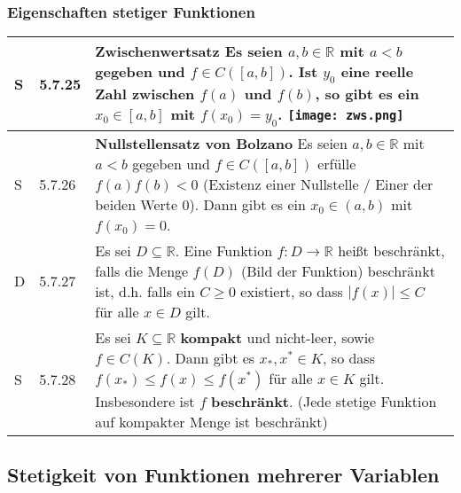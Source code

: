 \subsubsection{Eigenschaften stetiger Funktionen}

    \begin{longtable}{p{0.75cm} p{1cm} p{16cm}}
        \toprule
        S   & 5.7.25&   \textbf{Zwischenwertsatz} \hfill \break
                        Es seien $a,b \in \mathbb{R}$ mit $a < b$ gegeben und $f \in C([a,b])$. Ist $y_0$ eine reelle Zahl zwischen $f(a)$ und $f(b)$,
                        so gibt es ein $x_0 \in [a,b]$ mit $f(x_0) = y_0$. \hfill \break
                        \texttt{[image: zws.png]} \\
        \midrule
        S   & 5.7.26&   \textbf{Nullstellensatz von Bolzano} \hfill \break
                        Es seien $a,b \in \mathbb{R}$ mit $a < b$ gegeben und $f \in C([a,b])$ erfülle $f(a)f(b) < 0$ (Existenz einer Nullstelle /
                        Einer der beiden Werte 0).
                        Dann gibt es ein $x_0 \in (a,b)$ mit $f(x_0) = 0$. \\
        \midrule
        D   & 5.7.27&   Es sei $D \subseteq \mathbb{R}$. Eine Funktion $f: D \rightarrow \mathbb{R}$ hei\ss t beschränkt, falls die Menge
                        $f(D)$ (Bild der Funktion) beschränkt ist, d.h. falls ein $C \geq 0$ existiert, so dass $|f(x)| \leq C$ für alle $x \in D$ gilt. \\
        \midrule
        S   & 5.7.28&   Es sei $K \subseteq \mathbb{R}$ \textbf{kompakt} und nicht-leer, sowie $f \in C(K)$. Dann gibt es $x_*, x^* \in K$, so dass
                        $f(x_*) \leq f(x) \leq f(x^*)$ für alle $x \in K$ gilt. Insbesondere ist $f$ \textbf{beschränkt}. (Jede stetige Funktion auf 
                        kompakter Menge ist beschränkt)\\
        \bottomrule

    \end{longtable}


\subsection{Stetigkeit von Funktionen mehrerer Variablen}

